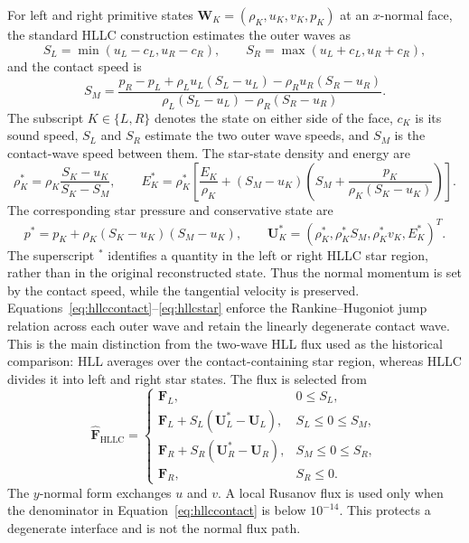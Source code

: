 For left and right primitive states \(\mathbf W_K=(\rho_K,u_K,v_K,p_K)\) at an \(x\)-normal face, the standard HLLC construction \cite{toro1994,toro2009} estimates the outer waves as
\begin{equation}
S_L=\min(u_L-c_L,u_R-c_R),\qquad
S_R=\max(u_L+c_L,u_R+c_R),
\end{equation}
and the contact speed is
\begin{equation}
S_M=
\frac{p_R-p_L+\rho_Lu_L(S_L-u_L)-\rho_Ru_R(S_R-u_R)}
{\rho_L(S_L-u_L)-\rho_R(S_R-u_R)}.
\label{eq:hllccontact}
\end{equation}
The subscript \(K\in\{L,R\}\) denotes the state on either side of the face,
\(c_K\) is its sound speed, \(S_L\) and \(S_R\) estimate the two outer wave
speeds, and \(S_M\) is the contact-wave speed between them.
The star-state density and energy are
\begin{equation}
\rho_K^*=\rho_K\frac{S_K-u_K}{S_K-S_M},\qquad
E_K^*=\rho_K^*\left[\frac{E_K}{\rho_K}+(S_M-u_K)
\left(S_M+\frac{p_K}{\rho_K(S_K-u_K)}\right)\right].
\end{equation}
The corresponding star pressure and conservative state are
\begin{equation}
p^*=p_K+\rho_K(S_K-u_K)(S_M-u_K),\qquad
\mathbf U_K^*=\left(\rho_K^*,\rho_K^*S_M,
\rho_K^*v_K,E_K^*\right)^T.
\label{eq:hllcstar}
\end{equation}
The superscript \(^*\) identifies a quantity in the left or right HLLC
star region, rather than in the original reconstructed state.
Thus the normal momentum is set by the contact speed, while the tangential velocity is preserved. Equations~\eqref{eq:hllccontact}--\eqref{eq:hllcstar} enforce the Rankine--Hugoniot jump relation across each outer wave and retain the linearly degenerate contact wave. This is the main distinction from the two-wave HLL flux used as the historical comparison: HLL averages over the contact-containing star region, whereas HLLC divides it into left and right star states. The flux is selected from
\begin{equation}
\widehat{\mathbf F}_{\mathrm{HLLC}}=
\begin{cases}
\mathbf F_L, & 0\le S_L,\\
\mathbf F_L+S_L(\mathbf U_L^*-\mathbf U_L), & S_L\le0\le S_M,\\
\mathbf F_R+S_R(\mathbf U_R^*-\mathbf U_R), & S_M\le0\le S_R,\\
\mathbf F_R, & S_R\le0.
\end{cases}
\label{eq:hllcflux}
\end{equation}
The \(y\)-normal form exchanges \(u\) and \(v\). A local Rusanov flux is used only when the denominator in Equation~\eqref{eq:hllccontact} is below \(10^{-14}\). This protects a degenerate interface and is not the normal flux path.

